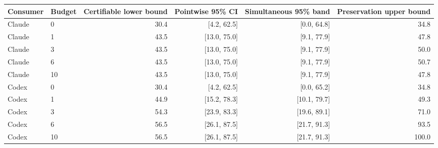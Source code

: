 \begin{tabular}{llrrrr}
\toprule
Consumer & Budget & Certifiable lower bound & Pointwise 95\% CI & Simultaneous 95\% band & Preservation upper bound \\
\midrule
Claude & 0 & 30.4 & [4.2, 62.5] & [0.0, 64.8] & 34.8 \\
Claude & 1 & 43.5 & [13.0, 75.0] & [9.1, 77.9] & 47.8 \\
Claude & 3 & 43.5 & [13.0, 75.0] & [9.1, 77.9] & 50.0 \\
Claude & 6 & 43.5 & [13.0, 75.0] & [9.1, 77.9] & 50.7 \\
Claude & 10 & 43.5 & [13.0, 75.0] & [9.1, 77.9] & 47.8 \\
Codex & 0 & 30.4 & [4.2, 62.5] & [0.0, 65.2] & 34.8 \\
Codex & 1 & 44.9 & [15.2, 78.3] & [10.1, 79.7] & 49.3 \\
Codex & 3 & 54.3 & [23.9, 83.3] & [19.6, 89.1] & 71.0 \\
Codex & 6 & 56.5 & [26.1, 87.5] & [21.7, 91.3] & 93.5 \\
Codex & 10 & 56.5 & [26.1, 87.5] & [21.7, 91.3] & 100.0 \\
\bottomrule
\end{tabular}
